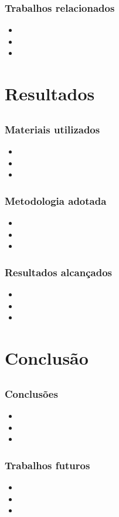 \documentclass{beamer}
\begin{document}
\begin{frame}
	\frametitle{Trabalhos relacionados}

	\begin{itemize}
		\item
		\item
		\item
	\end{itemize}
\end{frame}

\section{Resultados}
\subsection*{}

\begin{frame}
	\frametitle{Materiais utilizados}

	\begin{itemize}
		\item
		\item
		\item
	\end{itemize}
\end{frame}

\begin{frame}
	\frametitle{Metodologia adotada}

	\begin{itemize}
		\item
		\item
		\item
	\end{itemize}
\end{frame}

\begin{frame}
	\frametitle{Resultados alcan\c cados}

	\begin{itemize}
		\item
		\item
		\item
	\end{itemize}
\end{frame}

\section{Conclusão}
\subsection*{}

\begin{frame}
	\frametitle{Conclusões}

	\begin{itemize}
		\item
		\item
		\item
	\end{itemize}
\end{frame}

\begin{frame}
	\frametitle{Trabalhos futuros}

	\begin{itemize}
		\item
		\item
		\item
	\end{itemize}
\end{frame}
\end{document}
